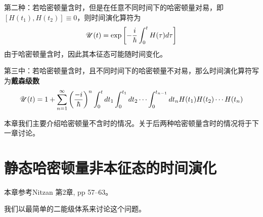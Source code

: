 第二种：若哈密顿量含时，但是在任意不同时间下的哈密顿量对易，即$ [H(t_1),H(t_2)]\equiv0 $，则时间演化算符为
\begin{equation}\label{key}
\mathscr{U}(t)=\exp\left[-\dfrac{i}{\hbar}\int_0^t H(\tau)d\tau\right]
\end{equation}
由于哈密顿量含时，因此其本征态可能随时间变化。

第三中：若哈密顿量含时，且不同时间下的哈密顿量不对易，那么时间演化算符写为\textbf{戴森级数}
\begin{equation}\label{key}
\mathscr{U}(t)=1+\sum_{n=1}^\infty\left(\dfrac{-i}{\hbar}\right)^n\int_0^tdt_1\int_0^{t_1}dt_2\cdots\int_0^{t_{n-1}}dt_n H(t_1)H(t_2)\cdots H(t_n)
\end{equation}

本章我们主要介绍哈密顿量不含时的情况。关于后两种哈密顿量含时的情况将于下一章讨论。

\section{静态哈密顿量非本征态的时间演化}
\begin{framed}
本章参考Nitzan 第2章, pp 57--63。	
\end{framed}

我们以最简单的二能级体系来讨论这个问题。

